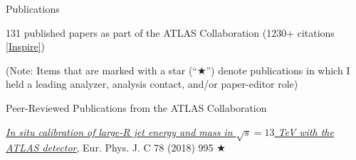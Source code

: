 
\newpage
\vspace{0.25in}
{\Large Publications}\\
\HRule

\vspace{0.15in}
\hspace{0.25in}\begin{minipage}{0.8\textwidth}


131 published papers as part of the ATLAS Collaboration (1230+ citations \href{https://inspirehep.net/authors/1409040}{[Inspire]})

\vspace{0.15in}
(Note: Items that are marked with a star (``$\bigstar$'') denote publications in which I held a leading analyzer, analysis contact, and/or paper-editor role)


\vspace{0.15in}
\hspace{0.2in}Peer-Reviewed Publications from the ATLAS Collaboration

\hspace{0.35in}\begin{minipage}{1.0\textwidth}

\vspace{0.15in}
\href{https://arxiv.org/abs/1807.09477}{\textit{In situ calibration of large-R jet energy and mass in $\sqrt{s} = 13$ TeV with the ATLAS detector}}, Eur. Phys. J. C 78 (2018) 995 $\bigstar$


\end{minipage}
\end{minipage}
